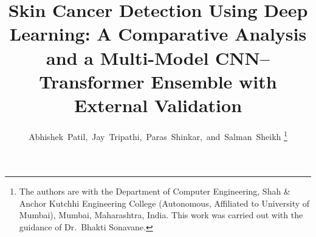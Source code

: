 
\title{Skin Cancer Detection Using Deep Learning: A Comparative Analysis
and a Multi-Model CNN--Transformer Ensemble with External Validation}

\ifCLASSOPTIONtwocolumn
  \makeatletter
  \def\@IEEEauthorblockNstyle{\normalfont\fontsize{13}{16}\selectfont}
  \def\@IEEEauthorblockAstyle{\normalfont\fontsize{10.5}{12.8}\selectfont}
  \makeatother
  \author{%
    }
\else
  \author{Abhishek~Patil,~Jay~Tripathi,~Paras~Shinkar,~and~Salman~Sheikh%
    \thanks{The authors are with the Department of Computer Engineering,
    Shah \& Anchor Kutchhi Engineering College (Autonomous, Affiliated to
    University of Mumbai), Mumbai, Maharashtra, India. This work was
    carried out with the guidance of Dr.~Bhakti Sonavane.}}
\fi

\maketitle

